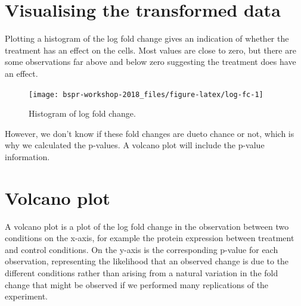 \documentclass[12pt,]{book}
\newenvironment{Shaded}{\begin{snugshade}}{\end{snugshade}}
\newcommand{\KeywordTok}[1]{\textcolor[rgb]{0.13,0.29,0.53}{\textbf{#1}}}
\newcommand{\DataTypeTok}[1]{\textcolor[rgb]{0.13,0.29,0.53}{#1}}
\newcommand{\FloatTok}[1]{\textcolor[rgb]{0.00,0.00,0.81}{#1}}
\newcommand{\StringTok}[1]{\textcolor[rgb]{0.31,0.60,0.02}{#1}}
\newcommand{\CommentTok}[1]{\textcolor[rgb]{0.56,0.35,0.01}{\textit{#1}}}
\newcommand{\OperatorTok}[1]{\textcolor[rgb]{0.81,0.36,0.00}{\textbf{#1}}}
\newcommand{\NormalTok}[1]{#1}
\theoremstyle{definition}
\theoremstyle{definition}
\theoremstyle{definition}
\theoremstyle{remark}
\begin{document}
\section{Visualising the transformed
data}\label{visualising-the-transformed-data}

Plotting a histogram of the log fold change gives an indication of
whether the treatment has an effect on the cells. Most values are close
to zero, but there are some observations far above and below zero
suggesting the treatment does have an effect.



\begin{Shaded}
\end{Shaded}

\begin{figure}

{\centering \texttt{[image: bspr-workshop-2018\_files/figure-latex/log-fc-1]} 

}

\caption{Histogram of log fold change.}\label{fig:log-fc}
\end{figure}

However, we don't know if these fold changes are dueto chance or not,
which is why we calculated the p-values. A volcano plot will include the
p-value information.

\section{Volcano plot}\label{volcano-plot}

A volcano plot is a plot of the log fold change in the observation
between two conditions on the x-axis, for example the protein expression
between treatment and control conditions. On the y-axis is the
corresponding p-value for each observation, representing the likelihood
that an observed change is due to the different conditions rather than
arising from a natural variation in the fold change that might be
observed if we performed many replications of the experiment.
\end{document}
